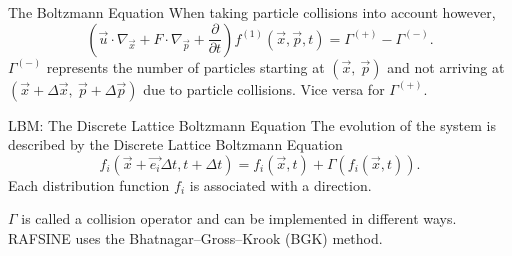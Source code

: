 \documentclass{beamer}
\begin{document}
\begin{frame}{The Boltzmann Equation}
When taking particle collisions into account however,
\begin{equation} \label{eq:be}
\left( \vec{u}\cdot\nabla_{\vec{x}} +F\cdot\nabla_{\vec{p}} + \frac{\partial}{\partial t} \right) f^{(1)}(\vec{x}, \vec{p}, t) = \Gamma^{(+)} - \Gamma^{(-)}.
\end{equation}
$\Gamma^{(-)}$ represents the number of particles starting at $(\vec{x},~\vec{p})$ and not arriving at $(\vec{x}+\Delta\vec{x},~\vec{p}+\Delta\vec{p})$ due to particle collisions. Vice versa for $\Gamma^{(+)}$.
\end{frame}

\begin{frame}{LBM: The Discrete Lattice Boltzmann Equation}
The evolution of the system is described by the Discrete Lattice Boltzmann Equation
\begin{equation} \label{eq:dbe}
f_i(\vec{x} + \vec{e_i}\Delta t, t + \Delta t) = f_i(\vec{x}, t) + \Gamma(f_i(\vec{x}, t)).
\end{equation}
Each distribution function $f_i$ is associated with a direction.

$\Gamma$ is called a collision operator and can be implemented in different ways. RAFSINE uses the Bhatnagar--Gross--Krook (BGK) method.

\end{frame}

\end{document}
